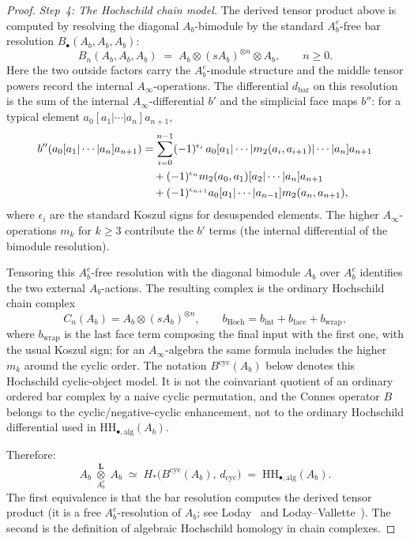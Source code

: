\begin{proof}
\medskip
\noindent\textit{Step~4: The Hochschild chain model.}
The derived tensor product above is computed by resolving the diagonal
\(A_b\)-bimodule by the standard \(A_b^e\)-free bar resolution
\(B_\bullet(A_b,A_b,A_b)\):
\begin{equation}\label{eq:thqg-two-sided-bar}
B_n(A_b,A_b,A_b)
\;=\;
A_b \otimes (sA_b)^{\otimes n} \otimes A_b, \qquad n \ge 0.
\end{equation}
Here the two outside factors carry the \(A_b^e\)-module structure and
the middle tensor powers record the internal \(A_\infty\)-operations.
The differential $d_{\mathrm{bar}}$ on this resolution is
the sum of the internal $A_\infty$-differential $b'$ and the
simplicial face maps $b''$: for a typical element
$a_0 [a_1 | \cdots | a_n] a_{n+1}$,
\begin{align}
b''(a_0 [a_1 | \cdots | a_n] a_{n+1})
&= \sum_{i=0}^{n-1} (-1)^{\epsilon_i}\,
 a_0 [a_1 | \cdots | m_2(a_i, a_{i+1}) | \cdots | a_n] a_{n+1}
 \notag \\
&\quad + (-1)^{\epsilon_n} m_2(a_0, a_1) [a_2 | \cdots | a_n] a_{n+1}
 \notag \\
&\quad + (-1)^{\epsilon_{n+1}} a_0 [a_1 | \cdots | a_{n-1}]
 m_2(a_n, a_{n+1}),
 \label{eq:thqg-bar-differential}
\end{align}
where $\epsilon_i$ are the standard Koszul signs for desuspended
elements. The higher
$A_\infty$-operations $m_k$ for $k \ge 3$ contribute the
$b'$ terms (the internal differential of the bimodule resolution).

Tensoring this \(A_b^e\)-free resolution with the diagonal bimodule
\(A_b\) over \(A_b^e\) identifies the two external \(A_b\)-actions.
The resulting complex is the ordinary Hochschild chain complex
\[
C_n(A_b)
  = A_b\otimes (sA_b)^{\otimes n},
\qquad
b_{\mathrm{Hoch}}=b_{\mathrm{int}}+b_{\mathrm{face}}+
b_{\mathrm{wrap}},
\]
where \(b_{\mathrm{wrap}}\) is the last face term composing the final
input with the first one, with the usual Koszul sign; for an
\(A_\infty\)-algebra the same formula includes the higher \(m_k\) around
the cyclic order.  The notation \(B^{\mathrm{cyc}}(A_b)\) below denotes
this Hochschild cyclic-object model.  It is not the coinvariant quotient
of an ordinary ordered bar complex by a naive cyclic permutation, and the
Connes operator \(B\) belongs to the cyclic/negative-cyclic enhancement,
not to the ordinary Hochschild differential used in
\(\mathrm{HH}_{\bullet,\mathrm{alg}}(A_b)\).

Therefore:
\begin{equation}\label{eq:thqg-bar-hochschild-id}
A_b \;\underset{A_b^e}{\overset{\mathbf{L}}{\otimes}}\; A_b
\;\simeq\;
H_*\!\bigl(B^{\mathrm{cyc}}(A_b),\, d_{\mathrm{cyc}}\bigr)
\;=\; \mathrm{HH}_{\bullet,\mathrm{alg}}(A_b).
\end{equation}
The first equivalence is that the bar resolution computes the derived
tensor product (it is a free $A_b^e$-resolution of $A_b$; see
Loday~\cite[\S5.3]{Loday98} and
Loday--Vallette~\cite[\S2.2]{LV12}). The second is the definition of
algebraic Hochschild homology in chain complexes.


\end{proof}
